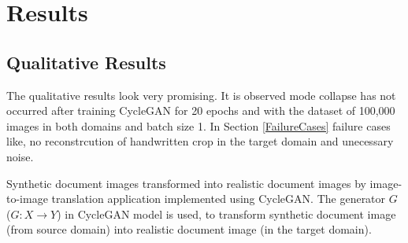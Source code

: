 \section{Results}\label{results}


\subsection{Qualitative Results}

The qualitative results look very promising. It is observed mode collapse has not occurred after training \ac{CycleGAN} for 20 epochs and with the dataset of 100,000 images in both domains and batch size 1. In Section \ref{FailureCases} failure cases like, no reconstrcution of handwritten crop in the target domain and unecessary noise.

Synthetic document images transformed into realistic document images by image-to-image translation application implemented using \ac{CycleGAN}. The generator $G$ ($G: X \rightarrow Y$) in \ac{CycleGAN} model is used, to transform synthetic document image (from source domain) into realistic document image (in the target domain).

